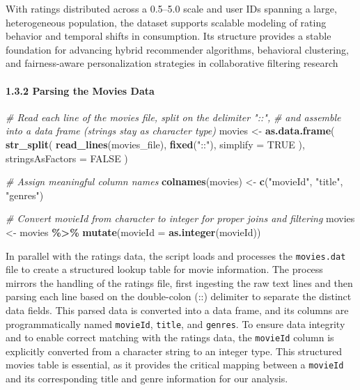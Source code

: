 \documentclass[
]{article}
\newenvironment{Shaded}{\begin{snugshade}}{\end{snugshade}}
\newcommand{\AttributeTok}[1]{\textcolor[rgb]{0.13,0.29,0.53}{#1}}
\newcommand{\CommentTok}[1]{\textcolor[rgb]{0.56,0.35,0.01}{\textit{#1}}}
\newcommand{\ConstantTok}[1]{\textcolor[rgb]{0.56,0.35,0.01}{#1}}
\newcommand{\FunctionTok}[1]{\textcolor[rgb]{0.13,0.29,0.53}{\textbf{#1}}}
\newcommand{\NormalTok}[1]{#1}
\newcommand{\OtherTok}[1]{\textcolor[rgb]{0.56,0.35,0.01}{#1}}
\newcommand{\SpecialCharTok}[1]{\textcolor[rgb]{0.81,0.36,0.00}{\textbf{#1}}}
\newcommand{\StringTok}[1]{\textcolor[rgb]{0.31,0.60,0.02}{#1}}
\begin{document}
With ratings distributed across a 0.5--5.0 scale and user IDs spanning a
large, heterogeneous population, the dataset supports scalable modeling
of rating behavior and temporal shifts in consumption. Its structure
provides a stable foundation for advancing hybrid recommender
algorithms, behavioral clustering, and fairness-aware personalization
strategies in collaborative filtering research

\newpage

\paragraph{1.3.2 Parsing the Movies Data}\label{parsing-the-movies-data}

\begin{Shaded}
\begin{Highlighting}[]
\CommentTok{\# Read each line of the movies file, split on the delimiter "::", }
\CommentTok{\# and assemble into a data frame (strings stay as character type)}
\NormalTok{movies }\OtherTok{\textless{}{-}} \FunctionTok{as.data.frame}\NormalTok{(}
  \FunctionTok{str\_split}\NormalTok{(}
    \FunctionTok{read\_lines}\NormalTok{(movies\_file), }
    \FunctionTok{fixed}\NormalTok{(}\StringTok{"::"}\NormalTok{), }
    \AttributeTok{simplify =} \ConstantTok{TRUE}
\NormalTok{  ), }
  \AttributeTok{stringsAsFactors =} \ConstantTok{FALSE}
\NormalTok{)}

\CommentTok{\# Assign meaningful column names}
\FunctionTok{colnames}\NormalTok{(movies) }\OtherTok{\textless{}{-}} \FunctionTok{c}\NormalTok{(}\StringTok{"movieId"}\NormalTok{, }\StringTok{"title"}\NormalTok{, }\StringTok{"genres"}\NormalTok{)}

\CommentTok{\# Convert movieId from character to integer for proper joins and filtering}
\NormalTok{movies }\OtherTok{\textless{}{-}}\NormalTok{ movies }\SpecialCharTok{\%\textgreater{}\%} 
  \FunctionTok{mutate}\NormalTok{(}\AttributeTok{movieId =} \FunctionTok{as.integer}\NormalTok{(movieId))}
\end{Highlighting}
\end{Shaded}

In parallel with the ratings data, the script loads and processes the
\texttt{movies.dat} file to create a structured lookup table for movie
information. The process mirrors the handling of the ratings file, first
ingesting the raw text lines and then parsing each line based on the
double-colon (::) delimiter to separate the distinct data fields. This
parsed data is converted into a data frame, and its columns are
programmatically named \texttt{movieId}, \texttt{title}, and
\texttt{genres}. To ensure data integrity and to enable correct matching
with the ratings data, the \texttt{movieId} column is explicitly
converted from a character string to an integer type. This structured
movies table is essential, as it provides the critical mapping between a
\texttt{movieId} and its corresponding title and genre information for
our analysis. \newpage
\end{document}
